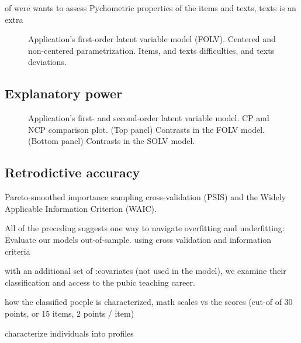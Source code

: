 of were wants to assess  Pychometric properties of the items and texts, texts is an extra
%
\begin{figure}[H]
	\centering
	\begin{subfigure}
		\texttt{[image: FOLV\_recovery\_items]}
	\end{subfigure}
	\begin{subfigure}
		\texttt{[image: FOLV\_recovery\_texts]}
	\end{subfigure}
	\caption[Application's first-order latent variable model (FOLV). Centered and non-centered parametrization. Items, and texts difficulties, and texts deviations.]%
	{Application's first-order latent variable model (FOLV). Centered and non-centered parametrization. Items, and texts difficulties, and texts deviations.}
	\label{fig:FOLV_CE.NC_recovery}
\end{figure}



\subsection{Explanatory power}

%
\begin{figure}[H]
	\centering
	\begin{subfigure}
		\texttt{[image: FOLV\_recovery\_contrast]}
	\end{subfigure}
	\begin{subfigure}
		\texttt{[image: SOLV\_recovery\_contrast]}
	\end{subfigure}
%
	\caption[Application's first- and second-order latent variable model. CP and NCP comparison plot.]%
	{Application's first- and second-order latent variable model. CP and NCP comparison plot. (Top panel) Contrasts in the FOLV model. (Bottom panel) Contrasts in the SOLV model. }
	\label{fig:contrast_both}
\end{figure}


\subsection{Retrodictive accuracy}

Pareto-smoothed importance sampling cross-validation (PSIS) and the  Widely Applicable Information Criterion (WAIC).

All of the preceding suggests one way to navigate overfitting and underfitting: Evaluate our models out-of-sample. using cross validation and information criteria


with an additional set of :covariates (not used in the model), we examine their classification and access to the pubic teaching career. 

how the classified poeple is characterized, math scales vs the scores (cut-of of 30 points, or 15 items, 2 points / item)

characterize individuals into profiles 




